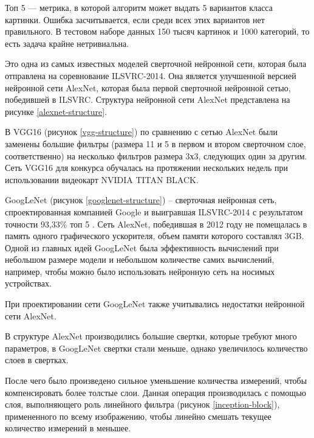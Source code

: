 Топ 5 — метрика, в которой алгоритм может выдать 5 вариантов класса картинки. Ошибка засчитывается, если среди всех этих вариантов нет правильного. В тестовом наборе данных 150 тысяч картинок и 1000 категорий, то есть задача крайне нетривиальна.

Это одна из самых известных моделей сверточной нейронной сети, которая была отправлена на соревнование ILSVRC-2014. Она является улучшенной версией нейронной сети AlexNet, которая была первой сверточной нейронной сетью, победившей в ILSVRC\cite{imagenet-challenge}. Структура нейронной сети AlexNet представлена на рисунке \ref{alexnet-structure}.


В VGG16 (рисунок \ref{vgg-structure}) по сравнению с сетью AlexNet были заменены большие фильтры (размера 11 и 5 в первом и втором сверточном слое, соответственно) на несколько фильтров размера 3х3, следующих один за другим. Сеть VGG16 для конкурса обучалась на протяжении нескольких недель при использовании видеокарт NVIDIA TITAN BLACK. 


GoogLeNet (рисунок \ref{googlenet-structure}) – сверточная нейронная сеть, спроектированная компанией Google и выигравшая ILSVRC-2014 с результатом точности 93,33\% топ 5 \cite{imagenet-challenge}.
Сеть AlexNet, победившая в 2012 году не помещалась в память одного графического ускорителя, объем памяти которого составлял 3GB. 
Одной из главных идей GoogLeNet была эффективность вычислений при небольшом размере модели и небольшом количестве самих вычислений, например, чтобы можно было использовать нейронную сеть на носимых устройствах.


При проектировании сети GoogLeNet также учитывались недостатки нейронной сети AlexNet. 

В структуре AlexNet производились большие свертки, которые требуют много параметров, в GoogLeNet свертки стали меньше, однако увеличилось количество слоев в свертках.

После чего было произведено сильное уменьшение количества измерений, чтобы компенсировать более толстые слои. 
Данная операция производилась с помощью слоя, выполняющего роль линейного фильтра (рисунок \ref{inception-block}), примененного по всему изображению, чтобы линейно смешать текущее количество измерений в меньшее.


